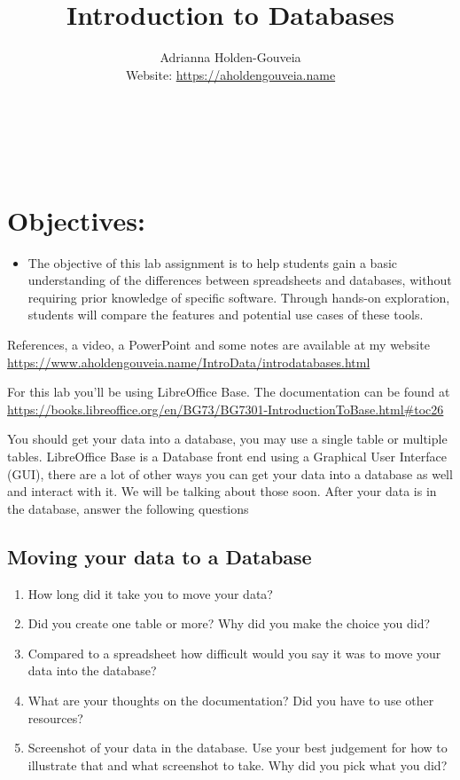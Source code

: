 \documentclass[12pt]{article}
\title{Introduction to Databases}
\author{
        Adrianna Holden-Gouveia \\
        Website: \url{https://aholdengouveia.name}\\ 
        \date{\vspace{-5ex}}
        \faLinkedin{: aholdengouveia} \\
        \faGithub {: aholdengouveia} \\
        \faTwitter {: aholdengouveia} \\
        }
\begin{document}
    

\maketitle


\section*{Objectives:}
\begin{itemize}
    \item The objective of this lab assignment is to help students gain a basic understanding of the differences between spreadsheets and databases, without requiring prior knowledge of specific software. Through hands-on exploration, students will compare the features and potential use cases of these tools.
\end{itemize}


References, a video, a PowerPoint and some notes are available at my website
\url {https://www.aholdengouveia.name/IntroData/introdatabases.html}

For this lab you'll be using LibreOffice Base.  The documentation can be found at \url{https://books.libreoffice.org/en/BG73/BG7301-IntroductionToBase.html#toc26}  

You should get your data into a database, you may use a single table or multiple tables. LibreOffice Base is a Database front end using a Graphical User Interface (GUI), there are a lot of other ways you can get your data into a database as well and interact with it. We will be talking about those soon. After your data is in the database, answer the following questions




\subsection*{Moving your data to a Database}
    \begin{enumerate}
        \item How long did it take you to move your data?
        \item Did you create one table or more? Why did you make the choice you did?
        \item Compared to a spreadsheet how difficult would you say it was to move your data into the database?
        \item What are your thoughts on the documentation? Did you have to use other resources? 
        \item Screenshot of your data in the database.  Use your best judgement for how to illustrate that and what screenshot to take.  Why did you pick what you did?
    \end{enumerate}
\end{document}
